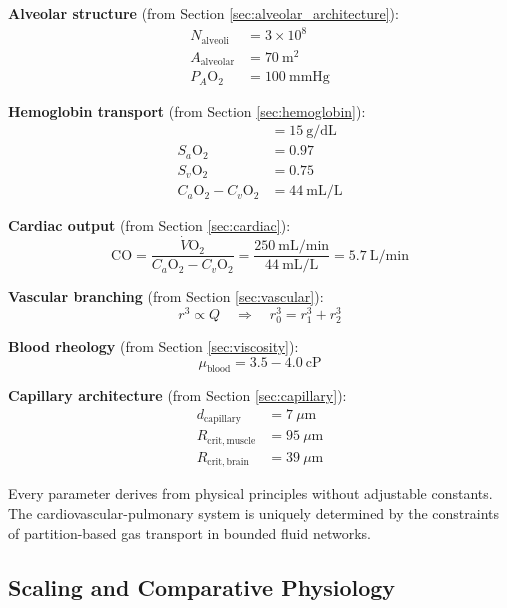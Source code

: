 \textbf{Alveolar structure} (from Section \ref{sec:alveolar_architecture}):
\begin{align}
N_{\mathrm{alveoli}} &= 3 \times 10^{8} \\
A_{\mathrm{alveolar}} &= 70~\mathrm{m}^{2} \\
P_{A}\mathrm{O}_{2} &= 100~\mathrm{mmHg}
\end{align}

\textbf{Hemoglobin transport} (from Section \ref{sec:hemoglobin}):
\begin{align}
[\mathrm{Hb}] &= 15~\mathrm{g/dL} \\
S_{a}\mathrm{O}_{2} &= 0.97 \\
S_{v}\mathrm{O}_{2} &= 0.75 \\
C_{a}\mathrm{O}_{2} - C_{v}\mathrm{O}_{2} &= 44~\mathrm{mL/L}
\end{align}

\textbf{Cardiac output} (from Section \ref{sec:cardiac}):
\begin{equation}
\mathrm{CO} = \frac{\dot{V}\mathrm{O}_{2}}{C_{a}\mathrm{O}_{2} - C_{v}\mathrm{O}_{2}} = \frac{250~\mathrm{mL/min}}{44~\mathrm{mL/L}} = 5.7~\mathrm{L/min}
\end{equation}

\textbf{Vascular branching} (from Section \ref{sec:vascular}):
\begin{equation}
r^{3} \propto Q \quad \Rightarrow \quad r_{0}^{3} = r_{1}^{3} + r_{2}^{3}
\end{equation}

\textbf{Blood rheology} (from Section \ref{sec:viscosity}):
\begin{equation}
\mu_{\mathrm{blood}} = 3.5-4.0~\mathrm{cP}
\end{equation}

\textbf{Capillary architecture} (from Section \ref{sec:capillary}):
\begin{align}
d_{\mathrm{capillary}} &= 7~\mu\mathrm{m} \\
R_{\mathrm{crit,muscle}} &= 95~\mu\mathrm{m} \\
R_{\mathrm{crit,brain}} &= 39~\mu\mathrm{m}
\end{align}

Every parameter derives from physical principles without adjustable constants. The cardiovascular-pulmonary system is uniquely determined by the constraints of partition-based gas transport in bounded fluid networks.

\subsection{Scaling and Comparative Physiology}

